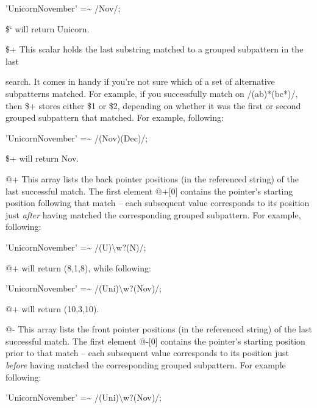\documentclass[a4paper,11pt]{book}
\begin{document}
\noindent 'UnicornNovember' =\~{} /Nov/;

\noindent \$` will return Unicorn.

\noindent 

\noindent \$+ This scalar holds the last substring matched to a grouped subpattern in the last

\noindent search. It comes in handy if you're not sure which of a set of alternative subpatterns matched. For example, if you successfully match on /(ab)*\textbar  (bc*)/, then \$+ stores either \$1 or \$2, depending on whether it was the first or second grouped subpattern that matched. For example, following:

\noindent 

\noindent 'UnicornNovember' =\~{} /(Nov)\textbar (Dec)/;

\noindent \$+ will return Nov.

\noindent 

\noindent @+ This array lists the back pointer positions (in the referenced string) of the last successful match. The first element @+[0] contains the pointer's starting position following that match -- each subsequent value corresponds to its position just \textit{after }having matched the corresponding grouped subpattern. For example, following:

\noindent 

\noindent 'UnicornNovember' =\~{} /(U)\textbackslash w?(N)/;

\noindent 

\noindent @+ will return (8,1,8), while following:

\noindent 

\noindent 'UnicornNovember' =\~{} /(Uni)\textbackslash w?(Nov)/;

\noindent 

\noindent @+ will return (10,3,10).

\noindent \eject 

\noindent @- This array lists the front pointer positions (in the referenced string) of the last successful match. The first element @-[0] contains the pointer's starting position prior to that match -- each subsequent value corresponds to its position just \textit{before }having matched the corresponding grouped subpattern. For example following:

\noindent 

\noindent 'UnicornNovember' =\~{} /(Uni)\textbackslash w?(Nov)/;

\noindent 
\end{document}
